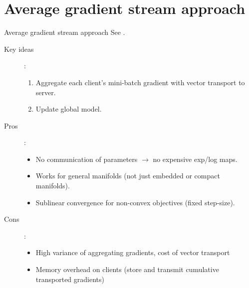 \documentclass[aspectratio=169,xcolor=dvipsnames]{beamer}
\begin{document}
\section{Average gradient stream approach}
\begin{frame}{Average gradient stream approach}
See \cite{huang2024riemannian}.
\begin{description}
\item[Key ideas]: 
\begin{enumerate}
\item Aggregate each client's mini-batch gradient with vector transport to server.
\item Update global model. 
\end{enumerate}
\item[Pros]:
\begin{itemize}
\item No communication of parameters $\to$ no expensive exp/log maps. 
\item Works for general manifolds (not just embedded or compact manifolds). 
\item Sublinear convergence for non-convex objectives (fixed step-size).
\end{itemize}
\item[Cons]:\begin{itemize}
\item High variance of aggregating gradients, cost of vector transport
\item Memory overhead on clients (store and transmit cumulative transported gradients)
\end{itemize}
\end{description}
\end{frame}
\end{document}
